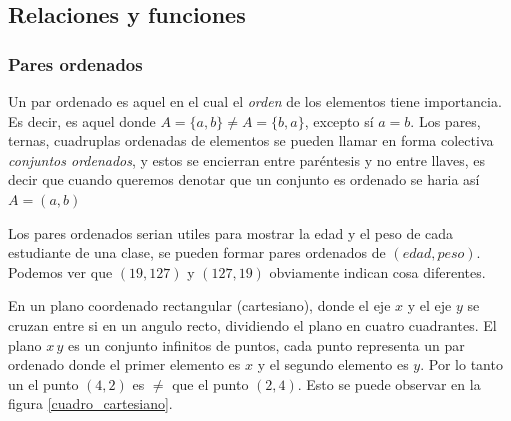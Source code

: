 
\subsection{Relaciones y funciones}

\subsubsection{Pares ordenados}

Un par ordenado es aquel en el cual el \textit{orden} de los elementos tiene importancia. Es decir, es aquel donde 
\(A = \{a , b\} \neq  A = \{b , a\}\), excepto sí \(a = b\). Los pares, ternas, cuadruplas ordenadas 
de elementos se pueden llamar en forma colectiva \textit{conjuntos ordenados}, y estos se encierran entre paréntesis 
y no entre llaves, es decir que cuando queremos denotar que un conjunto es ordenado se haria así \(A = (a , b)\)

\begin{ejemplo}
    Los pares ordenados serian utiles para mostrar la edad y el peso de cada estudiante de una clase, se pueden formar 
    pares ordenados de \((edad , peso)\). Podemos ver que \((19 , 127)\) y  \((127 , 19)\) obviamente
    indican cosa diferentes.
\end{ejemplo}

En un plano coordenado rectangular (cartesiano), donde el eje \(x\) y el eje \(y\) se cruzan entre si en un angulo 
recto, dividiendo el plano en cuatro cuadrantes. El plano \(x \, y\) es un conjunto infinitos de puntos, cada
punto representa un par ordenado donde el primer elemento es \(x\) y el segundo elemento es \(y\). Por lo tanto 
un el punto \((4 , 2)\) es \(\neq\) que el punto \((2 , 4)\). Esto se puede observar en la figura \ref{cuadro_cartesiano}.

